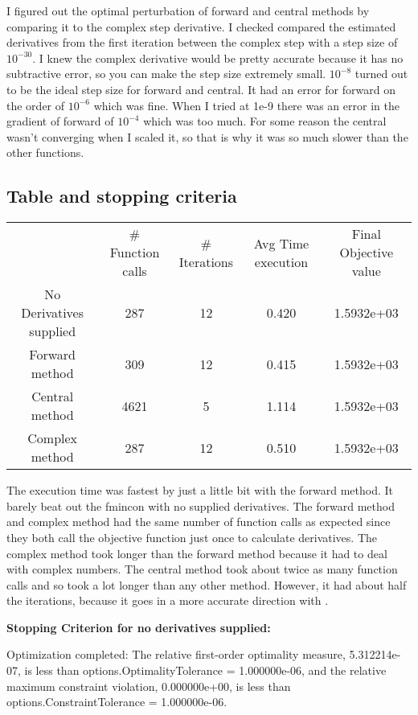 \documentclass[a4paper]{article}
\begin{document}
    I figured out the optimal perturbation of forward and central methods by comparing it to the complex step derivative.
    I checked compared the estimated derivatives from the first iteration between the complex step with a step size of $10^{-30}$. 
    I knew the complex derivative would be pretty accurate because it has no subtractive error, so you can make the step size extremely small. 
    $10^{-8}$ turned out to be the ideal step size for forward and central. It had an error for forward on the order of $10^{-6}$ which was fine.
    When I tried at 1e-9 there was an error in the gradient of forward of $10^{-4}$ which was too much. 
    For some reason the central wasn't converging when I scaled it, so that is why it was so much slower than the other functions.
    
    \subsection{Table and stopping criteria}
    \begin{center}
    \begin{tabular}[h]{c c c c c}
        & \# Function calls & \# Iterations & Avg Time execution& Final Objective value \\
        No Derivatives supplied&287&12&0.420 &1.5932e+03\\
        Forward method&309&12&0.415 & 1.5932e+03\\
        Central method&4621&5&1.114 & 1.5932e+03\\ 
        Complex method&287&12&0.510  &   1.5932e+03 
    \end{tabular}
\end{center}

The execution time was fastest by just a little bit with the forward method. It barely beat out the fmincon with no supplied derivatives.
The forward method and complex method had the same number of function calls as expected since they both call the objective function just once to calculate derivatives. 
The complex method took longer than the forward method because it had to deal with complex numbers. 
The central method took about twice as many function calls and so took a lot longer than any other method. 
However, it had about half the iterations, because it goes in a more accurate direction with .

\textbf{Stopping Criterion for no derivatives supplied: }

Optimization completed: The relative first-order optimality measure, 5.312214e-07,
is less than options.OptimalityTolerance = 1.000000e-06, and the relative maximum constraint
violation, 0.000000e+00, is less than options.ConstraintTolerance = 1.000000e-06.
\end{document}
